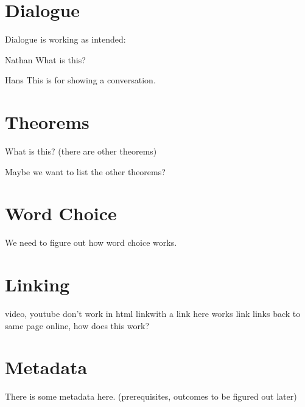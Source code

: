 \documentclass{ximera}
\begin{document}
\section{Dialogue}

Dialogue is working as intended:

\begin{dialogue}
\item[Nathan] What is this?
\item[Hans] This is for showing a conversation.
\end{dialogue}



\section{Theorems}

\begin{theorem}
What is this? (there are other theorems)
\end{theorem}

Maybe we want to list the other theorems?



\section{Word Choice}

We need to figure out how word choice works.



\section{Linking}

video, youtube don't work in html
link{with a link here} works
link{} links back to same page online, how does this work?

\link{} %



\section{Metadata}

There is some metadata here. (prerequisites, outcomes to be figured out later)
\end{document}
